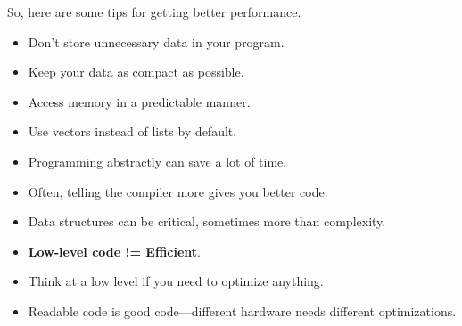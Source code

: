 \documentclass[11pt]{article}
\newenvironment{itemizep}{
 \begin{itemize}
  \setlength{\itemsep}{0pt}
  \setlength{\parsep}{3pt}
  \setlength{\topsep}{3pt}
  \setlength{\partopsep}{0pt}
  \setlength{\leftmargin}{1.5em}
  \setlength{\labelwidth}{1em}
  \setlength{\labelsep}{0.5em} }
 {\end{itemize}}
\begin{document}
So, here are some tips for getting better performance.
  \begin{itemizep}
    \item Don't store unnecessary data in your program.
    \item Keep your data as compact as possible.
    \item Access memory in a predictable manner.
    \item Use vectors instead of lists by default.
    \item Programming abstractly can save a lot of time.
    \item Often, telling the compiler more gives you better code.
    \item Data structures can be critical, sometimes more than complexity.
    \item {\bf Low-level code != Efficient}.
    \item Think at a low level if you need to optimize anything.
    \item Readable code is good code---different hardware needs different
      optimizations.
  \end{itemizep}

  
\end{document}
